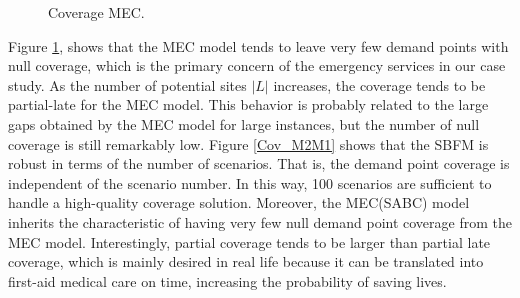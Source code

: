 \begin{figure}[H]
\hspace{0.4cm}%
\vspace{0.4cm}
\caption{Coverage MEC.}
\label{Cov_MEC}
\end{figure}
   


Figure \ref{Cov_MEC}, shows that the MEC model tends to leave very few demand points with null coverage, which is the primary concern of the emergency services in our case study. As the number of potential sites $|L|$ increases, the coverage tends to be partial-late for the MEC model. This behavior is probably related to the large gaps obtained by the MEC model for large instances, but the number of null coverage is still remarkably low.  
Figure \ref{Cov_M2M1} shows that the SBFM is robust in terms of the number of scenarios. That is, the demand point coverage is independent of the scenario number. In this way, 100 scenarios are sufficient to handle a high-quality coverage solution. Moreover, the MEC(SABC) model inherits the characteristic of having very few null demand point coverage from the MEC model. Interestingly, partial coverage tends to be larger than partial late coverage, which is mainly desired in real life because it can be translated into first-aid medical care on time, increasing the probability of saving lives. 

